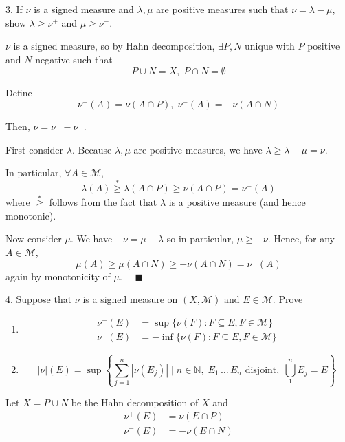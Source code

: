 \documentclass[12pt]{article}
\newcommand{\N}{\mathbb{N}}
\newcommand{\qed}{\quad \blacksquare}
\newcommand{\abs}[1]{\left\vert #1 \right\vert}
\newcommand{\M}{\mathcal{M}}
\newcommand{\sub}{\subseteq}
\begin{document}
    \color{black}

\pagebreak 

3. If $\nu$ is a signed measure and $\lambda, \mu$ are positive measures such that $\nu = \lambda - \mu$, show $\lambda \geq \nu^+$ and $\mu \geq \nu^-$.

    \color{blue}
        $\nu$ is a signed measure, so by Hahn decomposition, $\exists P, N$ unique with $P$ positive and $N$ negative such that
        \[P \cup N = X, \; P \cap N = \emptyset\]

        Define 
        \[\nu^+(A) = \nu(A \cap P), \; \nu^-(A) = -\nu(A \cap N)\]

        Then, $\nu = \nu^+ - \nu^-$.

        First consider $\lambda$. Because $\lambda, \mu$ are positive measures, we have $\lambda \geq \lambda - \mu = \nu$. 

        In particular, $\forall A \in \M$, 
        \[\lambda(A) \overset{*}{\geq} \lambda(A \cap P) \geq \nu(A \cap P) = \nu^+(A)\]
        where $\overset{*}{\geq}$ follows from the fact that $\lambda$ is a positive measure (and hence monotonic).

        Now consider $\mu$. We have $-\nu = \mu - \lambda$ so in particular, $\mu \geq -\nu$. Hence, for any $A \in \M$,
        \[\mu(A) \geq \mu(A \cap N) \geq -\nu(A \cap N) = \nu^-(A)\]
        again by monotonicity of $\mu$. $\qed$
       
    \color{black}


\pagebreak

4. Suppose that $\nu$ is a signed measure on $(X, \M)$ and $E \in \M$. Prove 
\begin{enumerate}
    \item \begin{align*}
        \nu^+(E) &= \sup\{\nu(F): F \sub E, F \in \M\} \\
        \nu^-(E) &= -\inf\{\nu(F): F \sub E, F \in \M\} 
    \end{align*}

    \item 
    \[\abs{\nu}(E) = \sup \left\{\sum_{j=1}^n \abs{\nu(E_j)} \; \bigg\vert \; n \in \N,\; E_1\, \dots\, E_n  \text{ disjoint}, \; \bigcup_1^n E_j = E\right\}\]
\end{enumerate}

    \color{blue}
        Let $X = P \cup N$ be the Hahn decomposition of $X$ and 
        \begin{align*}
            \nu^+(E) &= \nu(E \cap P)\\ 
            \nu^-(E) &= -\nu(E \cap N)
        \end{align*}
        
\end{document}

